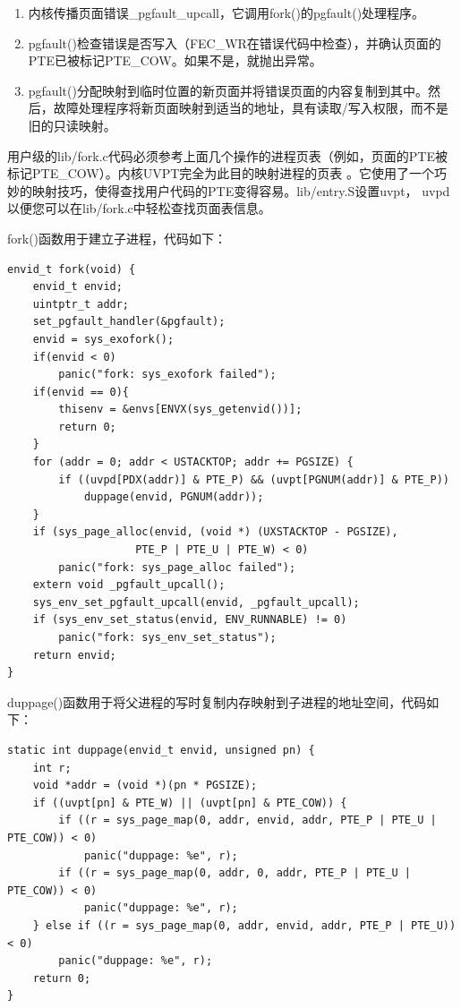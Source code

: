 \begin{ExerciseList}
\begin{enumerate}
\item 内核传播页面错误\_pgfault\_upcall，它调用fork()的pgfault()处理程序。
\item pgfault()检查错误是否写入（FEC\_WR在错误代码中检查），并确认页面的PTE已被标记PTE\_COW。如果不是，就抛出异常。
\item pgfault()分配映射到临时位置的新页面并将错误页面的内容复制到其中。然后，故障处理程序将新页面映射到适当的地址，具有读取/写入权限，而不是旧的只读映射。
\end{enumerate}

用户级的lib/fork.c代码必须参考上面几个操作的进程页表（例如，页面的PTE被标记PTE\_COW）。内核UVPT完全为此目的映射进程的页表 。它使用了一个巧妙的映射技巧，使得查找用户代码的PTE变得容易。lib/entry.S设置uvpt， uvpd以便您可以在lib/fork.c中轻松查找页面表信息。


fork()函数用于建立子进程，代码如下：

\begin{verbatim}
envid_t fork(void) {
    envid_t envid;
    uintptr_t addr;
    set_pgfault_handler(&pgfault);
    envid = sys_exofork();
    if(envid < 0)
        panic("fork: sys_exofork failed");
    if(envid == 0){
        thisenv = &envs[ENVX(sys_getenvid())];
        return 0;
    }
    for (addr = 0; addr < USTACKTOP; addr += PGSIZE) {
        if ((uvpd[PDX(addr)] & PTE_P) && (uvpt[PGNUM(addr)] & PTE_P))
            duppage(envid, PGNUM(addr));
    }
    if (sys_page_alloc(envid, (void *) (UXSTACKTOP - PGSIZE),
                    PTE_P | PTE_U | PTE_W) < 0)
        panic("fork: sys_page_alloc failed");
    extern void _pgfault_upcall();
    sys_env_set_pgfault_upcall(envid, _pgfault_upcall);
    if (sys_env_set_status(envid, ENV_RUNNABLE) != 0)
        panic("fork: sys_env_set_status");
    return envid;
}
\end{verbatim}

duppage()函数用于将父进程的写时复制内存映射到子进程的地址空间，代码如下：

\begin{verbatim}
static int duppage(envid_t envid, unsigned pn) {
    int r;
    void *addr = (void *)(pn * PGSIZE);
    if ((uvpt[pn] & PTE_W) || (uvpt[pn] & PTE_COW)) {
        if ((r = sys_page_map(0, addr, envid, addr, PTE_P | PTE_U | PTE_COW)) < 0)
            panic("duppage: %e", r);
        if ((r = sys_page_map(0, addr, 0, addr, PTE_P | PTE_U | PTE_COW)) < 0)
            panic("duppage: %e", r);
    } else if ((r = sys_page_map(0, addr, envid, addr, PTE_P | PTE_U)) < 0)
        panic("duppage: %e", r);
    return 0;
}
\end{verbatim}


\end{ExerciseList}
